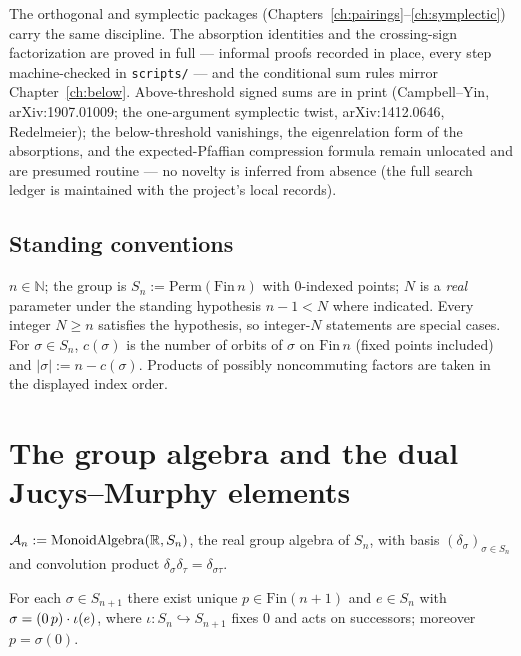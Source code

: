 The orthogonal and symplectic packages (Chapters~\ref{ch:pairings}--\ref{ch:symplectic}) carry the same
discipline. The absorption identities and the crossing-sign factorization
are proved in full --- informal proofs recorded in place, every step
machine-checked in \texttt{scripts/} --- and the conditional sum rules
mirror Chapter~\ref{ch:below}. Above-threshold signed sums are in print
(Campbell--Yin, arXiv:1907.01009; the one-argument symplectic twist,
arXiv:1412.0646, Redelmeier); the below-threshold vanishings, the
eigenrelation form of the absorptions, and the expected-Pfaffian
compression formula remain unlocated and are presumed routine --- no
novelty is inferred from absence
(the full search ledger is maintained with the project's local records).

\section*{Standing conventions}

$n\in\mathbb{N}$; the group is $S_n:=\mathrm{Perm}(\mathrm{Fin}\,n)$ with
$0$-indexed points; $N$ is a \emph{real} parameter under the standing
hypothesis $n-1<N$ where indicated. Every integer $N\ge n$ satisfies the
hypothesis, so integer-$N$ statements are special cases.
For $\sigma\in S_n$, $c(\sigma)$ is the number of orbits of $\sigma$ on
$\mathrm{Fin}\,n$ (fixed points included) and $|\sigma|:=n-c(\sigma)$.
Products of possibly noncommuting factors are taken in the displayed index
order.

\chapter{The group algebra and the dual Jucys--Murphy elements}\label{ch:jm}

\begin{definition}\label{def:symAlg}
\leanok
$\mathcal{A}_{n}:=\mathrm{MonoidAlgebra}(\mathbb{R},S_n)$, the real group algebra of
$S_n$, with basis $(\delta_\sigma)_{\sigma\in S_n}$ and convolution
product $\delta_\sigma\delta_\tau=\delta_{\sigma\tau}$.
\end{definition}

\begin{lemma}\label{lem:decomposeFin}
\mathlibok
For each $\sigma\in S_{n+1}$ there exist unique $p\in\mathrm{Fin}(n{+}1)$
and $e\in S_n$ with $\sigma=(0\,p)\cdot\iota(e)$, where
$\iota:S_n\hookrightarrow S_{n+1}$ fixes $0$ and acts on successors;
moreover $p=\sigma(0)$.
\end{lemma}

